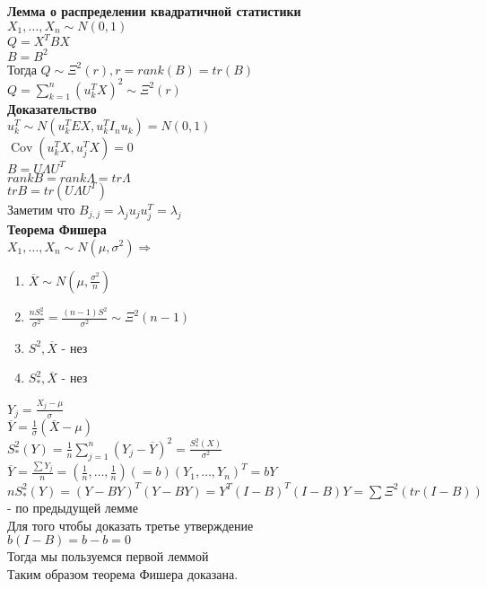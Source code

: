 \documentclass{article}
\newcommand\0{\mathbb{0}}
\DeclareMathOperator{\Cov}{Cov}
\newcommand\1{\mathbb{1}}
\renewcommand{\bf}{\textbf}
\newcommand{\Rto}{\Rightarrow}
\begin{document}
\textbf{Лемма о распределении квадратичной статистики}\\
$X_1, \dots, X_n \sim N(0, 1)$\\
$Q = X^TBX$\\
$B = B^2$\\
Тогда $Q \sim \Xi^2(r), r = rank(B) = tr(B)$\\
$Q = \displaystyle\sum_{k = 1}^n (u_k^T X)^2 \sim \Xi^2(r)$\\
\bf{Доказательство}\\
$u_k^T \sim N(u_k^T EX, u_k^T I_nu_k) = N(0, 1)$\\
$\Cov(u_k^TX, u_j^TX) = 0$\\
$B = U \Lambda U^T$\\
$rank B = rank \Lambda = tr \Lambda$\\
$tr B = tr(U \Lambda U^T)$\\
Заметим что $B_{j, j} = \lambda_j u_j u_j^T = \lambda_j$\\
\textbf{Теорема Фишера}\\
$X_1, \dots, X_n \sim N(\mu, \sigma^2) \Rto$\\
\begin{enumerate}
    \item $\overline{X} \sim N(\mu, \frac{\sigma^2}{n})$
    \item $\frac{n S_*^2}{\sigma^2} = \frac{(n - 1)S^2}{\sigma^2} \sim \Xi^2(n - 1)$
    \item $S^2, \overline{X}$ - нез
    \item $S_*^2, \overline{X}$ - нез
\end{enumerate}
$Y_j = \frac{X_j - \mu}{\sigma}$\\
$\overline{Y} = \frac{1}{\sigma}(\overline{X} - \mu)$\\
$S_*^2(Y) = \frac{1}{n} \displaystyle\sum_{j = 1}^n (Y_j - \overline{Y})^2 = \frac{S_*^2(X)}{\sigma^2}$\\
$\overline{Y} = \frac{\sum Y_j}{n} = (\frac{1}{n}, \dots, \frac{1}{n}) (= b) (Y_1, \dots, Y_n)^T = bY$\\
$nS_*^2(Y) = (Y - BY)^T(Y - BY) = Y^T(I - B)^T(I - B)Y = \sum \Xi^2(tr(I - B))$ - по предыдущей лемме\\
Для того чтобы доказать третье утверждение\\
$b(I - B) = b - b = 0$\\
Тогда мы пользуемся первой леммой\\
Таким образом теорема Фишера доказана.\\
\end{document}
